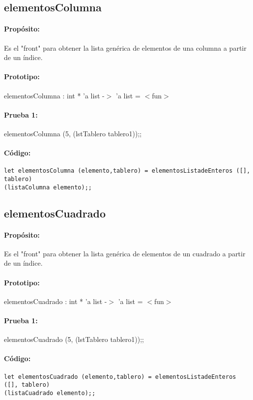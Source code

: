 \subsection{elementosColumna}

\paragraph{Propósito:} Es el "front" para obtener la lista genérica de elementos de una
columna a partir de un índice.
\paragraph{Prototipo:} elementosColumna : int * 'a list -$>$ 'a list = $<$fun$>$
\paragraph{Prueba 1:} elementosColumna (5, (lstTablero tablero1));;
\paragraph{Código:}
\begin{verbatim}
let elementosColumna (elemento,tablero) = elementosListadeEnteros ([], tablero)
(listaColumna elemento);;
\end{verbatim}

\subsection{elementosCuadrado}

\paragraph{Propósito:} Es el "front" para obtener la lista genérica de elementos de un
cuadrado a partir de un índice.
\paragraph{Prototipo:} elementosCuadrado : int * 'a list -$>$ 'a list = $<$fun$>$
\paragraph{Prueba 1:}elementosCuadrado (5, (lstTablero tablero1));;
\paragraph{Código:}
\begin{verbatim}
let elementosCuadrado (elemento,tablero) = elementosListadeEnteros ([], tablero)
(listaCuadrado elemento);;

\end{verbatim}

